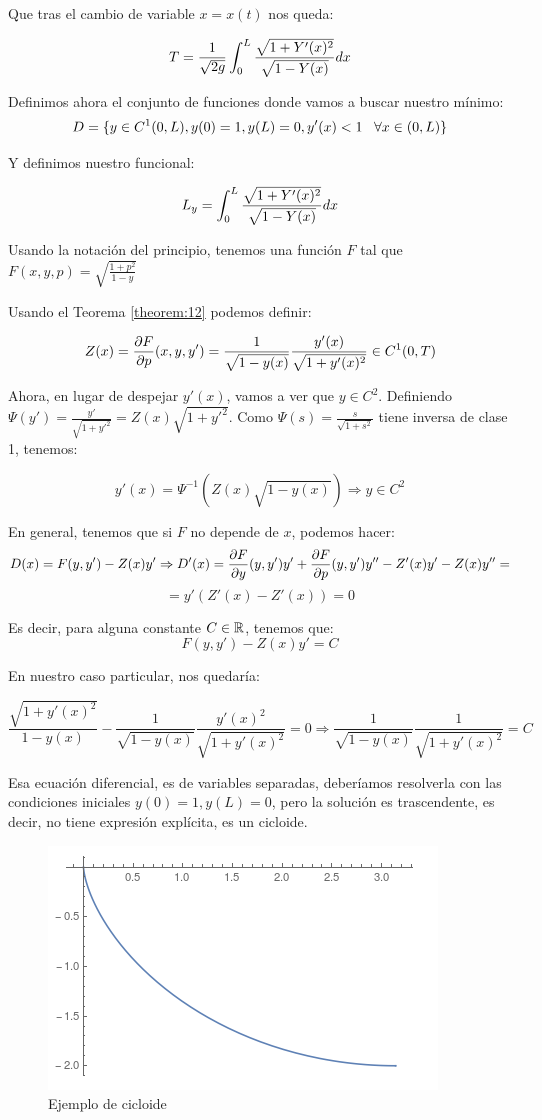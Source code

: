 Que tras el cambio de variable $x=x(t)$ nos queda:

\[
T=\frac{1}{\sqrt{2g}}\displaystyle\int_{ 0 }^{ L } \frac{\sqrt{1+Y'(x)^2}}{\sqrt{1-Y(x)}}dx
\]

Definimos ahora el conjunto de funciones donde vamos a buscar nuestro mínimo:
\[
D=\{y\in C^1(0,L),y(0)=1,y(L)=0, y'(x)<1 \;\;\; \forall x \in(0,L)\}
\]

Y definimos nuestro funcional:

\[
L_y=\displaystyle\int_{ 0 }^{ L } \frac{\sqrt{1+Y'(x)^2}}{\sqrt{1-Y(x)}}dx
\]

Usando la notación del principio, tenemos una función $F$ tal que $F(x,y,p)=\sqrt{\frac{1+p^2}{1-y}}$

Usando el Teorema \ref{theorem:12} podemos definir:

\[
Z(x)=\frac{\partial F }{\partial p }(x,y,y')=\frac{1}{\sqrt{1-y(x)}}\frac{y'(x)}{\sqrt{1+y'(x)^2}} \in C^1(0,T)
\]

Ahora, en lugar de despejar $y'(x)$, vamos a ver que $y\in C^2$. Definiendo $\Psi(y')=\frac{y'}{\sqrt{1+y'^2}}=Z(x)\sqrt{1+y'^2}$. Como $\Psi(s)=\frac{s}{\sqrt{1+s^2}}$ tiene inversa de clase 1, tenemos:

\[
y'(x)=\Psi^{-1}(Z(x)\sqrt{1-y(x)})\Rightarrow y\in C^2
\]

En general, tenemos que si $F$ no depende de $x$, podemos hacer:
\[D(x)=F(y,y')-Z(x)y'\Rightarrow D'(x)=\frac{\partial F }{\partial y }(y,y')y'+\frac{\partial F }{\partial p }(y,y')y''-Z'(x)y'-Z(x)y''=\]
\[
=y'(Z'(x)-Z'(x))=0
\]

Es decir, para alguna constante $C\in\mathbb{R}$, tenemos que:
\[
F(y,y')-Z(x)y'=C
\]

En nuestro caso particular, nos quedaría:

\[
\frac{\sqrt{1+y'(x)^2}}{1-y(x)}-\frac{1}{\sqrt{1-y(x)}}\frac{y'(x)^2}{\sqrt{1+y'(x)^2}}=0 \Rightarrow \frac{1}{\sqrt{1-y(x)}}\frac{1}{\sqrt{1+y'(x)^2}}=C
\]

Esa ecuación diferencial, es de variables separadas, deberíamos resolverla con las condiciones iniciales $y(0)=1,y(L)=0$, pero la solución es trascendente, es decir, no tiene expresión explícita, es un cicloide.

\begin{figure}[h!]
   \center
  \includegraphics[scale=0.5]{img/cicloide.png}
  \caption{Ejemplo de cicloide}
\end{figure}

